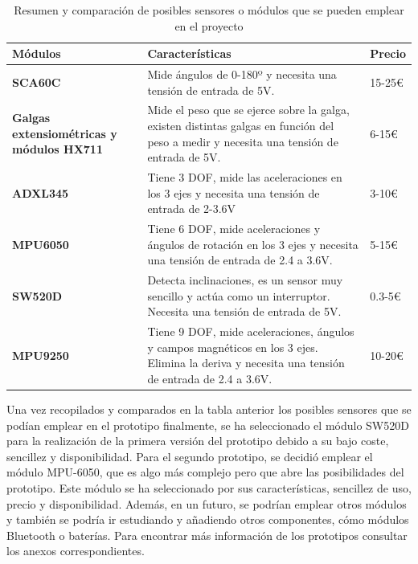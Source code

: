 \newpage


\begin{table}[h!]
\centering
\begin{tabular}{ |m{3.5cm}|m{8.5cm}|m{2cm}|  } 
\hline
\cellcolor[HTML]{B9E3F0}\textbf{Módulos} & \cellcolor[HTML]{B9E3F0}\textbf{Características} & \cellcolor[HTML]{B9E3F0}\textbf{Precio}\\

\hline
\cellcolor[HTML]{EFEFEF}\textbf{SCA60C}             & {Mide ángulos de 0-180º y necesita una tensión de entrada de 5V.}   & 15-25€\\
\hline
\cellcolor[HTML]{EFEFEF}\textbf{Galgas extensiométricas y módulos HX711}                & {Mide el peso que se ejerce sobre la galga, existen distintas galgas en función del peso a medir y necesita una tensión de entrada de 5V.} & 6-15€\\
\hline
\cellcolor[HTML]{EFEFEF}\textbf{ADXL345}                & {Tiene 3 DOF, mide las aceleraciones en los 3 ejes y necesita una tensión de entrada de 2-3.6V} & 3-10€\\
\hline
\cellcolor[HTML]{EFEFEF}\textbf{MPU6050}                & {Tiene 6 DOF, mide aceleraciones y ángulos de rotación en los 3 ejes y necesita una tensión de entrada de 2.4 a 3.6V.} & 5-15€\\
\hline
\cellcolor[HTML]{EFEFEF}\textbf{SW520D}                & {Detecta inclinaciones, es un sensor muy sencillo y actúa como un interruptor. Necesita una tensión de entrada de 5V.} & 0.3-5€\\
\hline
\cellcolor[HTML]{EFEFEF}\textbf{MPU9250}                & {Tiene 9 DOF, mide aceleraciones, ángulos y campos magnéticos en los 3 ejes. Elimina la deriva y necesita una tensión de entrada de 2.4 a 3.6V.} & 10-20€\\
\hline
\end{tabular}
\caption{Resumen y comparación de posibles sensores o módulos que se pueden emplear en el proyecto}
\end{table}


Una vez recopilados y comparados en la tabla anterior los posibles sensores que se podían emplear en el prototipo finalmente, se ha seleccionado el módulo SW520D para la realización de la primera versión del prototipo debido a su bajo coste, sencillez y disponibilidad. Para el segundo prototipo, se decidió emplear el módulo MPU-6050, que es algo más complejo pero que abre las posibilidades del prototipo. Este módulo se ha seleccionado por sus características, sencillez de uso, precio y disponibilidad. Además, en un futuro, se podrían emplear otros módulos y también se podría ir estudiando y añadiendo otros componentes, cómo módulos Bluetooth o baterías. Para encontrar más información de los prototipos consultar los anexos correspondientes.